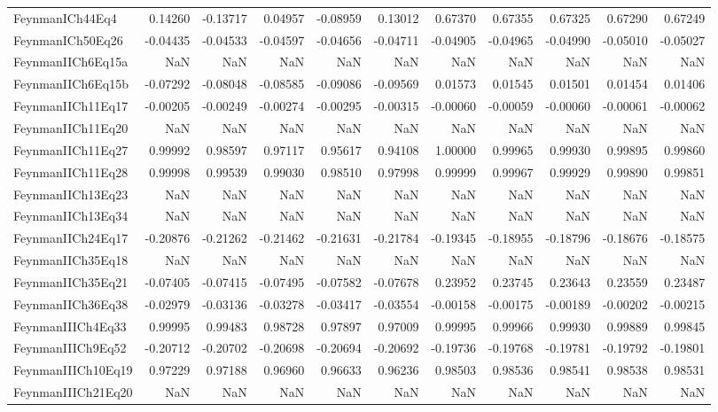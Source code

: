 \begin{tabular}{lrrrrrrrrrr}
FeynmanICh44Eq4 & 0.14260 & -0.13717 & 0.04957 & -0.08959 & 0.13012 & 0.67370 & 0.67355 & 0.67325 & 0.67290 & 0.67249 \\
FeynmanICh50Eq26 & -0.04435 & -0.04533 & -0.04597 & -0.04656 & -0.04711 & -0.04905 & -0.04965 & -0.04990 & -0.05010 & -0.05027 \\
FeynmanIICh6Eq15a & NaN & NaN & NaN & NaN & NaN & NaN & NaN & NaN & NaN & NaN \\
FeynmanIICh6Eq15b & -0.07292 & -0.08048 & -0.08585 & -0.09086 & -0.09569 & 0.01573 & 0.01545 & 0.01501 & 0.01454 & 0.01406 \\
FeynmanIICh11Eq17 & -0.00205 & -0.00249 & -0.00274 & -0.00295 & -0.00315 & -0.00060 & -0.00059 & -0.00060 & -0.00061 & -0.00062 \\
FeynmanIICh11Eq20 & NaN & NaN & NaN & NaN & NaN & NaN & NaN & NaN & NaN & NaN \\
FeynmanIICh11Eq27 & 0.99992 & 0.98597 & 0.97117 & 0.95617 & 0.94108 & 1.00000 & 0.99965 & 0.99930 & 0.99895 & 0.99860 \\
FeynmanIICh11Eq28 & 0.99998 & 0.99539 & 0.99030 & 0.98510 & 0.97998 & 0.99999 & 0.99967 & 0.99929 & 0.99890 & 0.99851 \\
FeynmanIICh13Eq23 & NaN & NaN & NaN & NaN & NaN & NaN & NaN & NaN & NaN & NaN \\
FeynmanIICh13Eq34 & NaN & NaN & NaN & NaN & NaN & NaN & NaN & NaN & NaN & NaN \\
FeynmanIICh24Eq17 & -0.20876 & -0.21262 & -0.21462 & -0.21631 & -0.21784 & -0.19345 & -0.18955 & -0.18796 & -0.18676 & -0.18575 \\
FeynmanIICh35Eq18 & NaN & NaN & NaN & NaN & NaN & NaN & NaN & NaN & NaN & NaN \\
FeynmanIICh35Eq21 & -0.07405 & -0.07415 & -0.07495 & -0.07582 & -0.07678 & 0.23952 & 0.23745 & 0.23643 & 0.23559 & 0.23487 \\
FeynmanIICh36Eq38 & -0.02979 & -0.03136 & -0.03278 & -0.03417 & -0.03554 & -0.00158 & -0.00175 & -0.00189 & -0.00202 & -0.00215 \\
FeynmanIIICh4Eq33 & 0.99995 & 0.99483 & 0.98728 & 0.97897 & 0.97009 & 0.99995 & 0.99966 & 0.99930 & 0.99889 & 0.99845 \\
FeynmanIIICh9Eq52 & -0.20712 & -0.20702 & -0.20698 & -0.20694 & -0.20692 & -0.19736 & -0.19768 & -0.19781 & -0.19792 & -0.19801 \\
FeynmanIIICh10Eq19 & 0.97229 & 0.97188 & 0.96960 & 0.96633 & 0.96236 & 0.98503 & 0.98536 & 0.98541 & 0.98538 & 0.98531 \\
FeynmanIIICh21Eq20 & NaN & NaN & NaN & NaN & NaN & NaN & NaN & NaN & NaN & NaN \\

\end{tabular}
